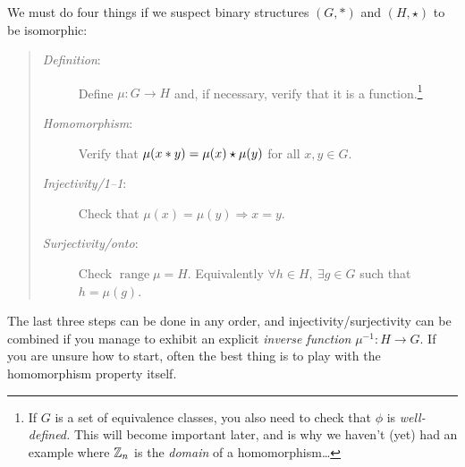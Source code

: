 \vspace{-5pt}


We must do four things if we suspect binary structures $(G,*)$ and $(H,\star)$ to be isomorphic:
\begin{quote}
	\begin{description}
		\item[\emph{Definition}:] Define $\mu:G\to H$ and, if necessary, verify that it is a function.\footnote{%
			If $G$ is a set of equivalence classes, you also need to check that $\phi$ is \emph{well-defined.} This will become important later, and is why we haven't (yet) had an example where $\mathbb{Z}_n$ is the \emph{domain} of a homomorphism\ldots%
			}
		\item[\emph{Homomorphism}:] Verify that $\mu(x\mathbin{\ast} y)=\mu(x)\mathbin{\star}\mu(y)$ for all $x,y\in G$.
		\item[\emph{Injectivity/1--1}:] Check that $\mu(x)=\mu(y)\Longrightarrow x=y$.
		\item[\emph{Surjectivity/onto}:] Check $\operatorname{range}\mu=H$. Equivalently $\forall h\in H,\ \exists g\in G$ such that $h=\mu(g)$.
	\end{description}
\end{quote}

The last three steps can be done in any order, and injectivity/surjectivity can be combined if you manage to exhibit an explicit \emph{inverse function} $\mu^{-1}:H\to G$. If you are unsure how to start, often the best thing is to play with the homomorphism property itself.


